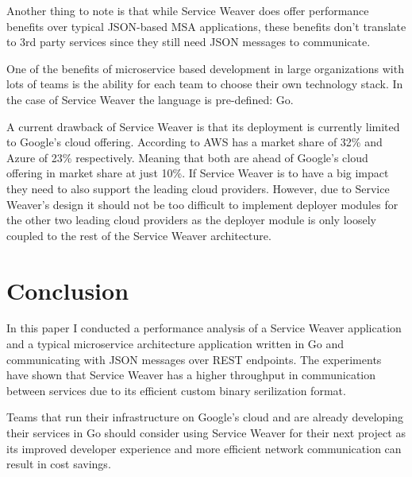 \documentclass[sigconf,review,9pt]{acmart}
\begin{document}
Another thing to note is that while Service Weaver does offer performance benefits
over typical JSON-based MSA applications, these benefits don't translate to 3rd party
services since they still need JSON messages to communicate.

One of the benefits of microservice based development in large organizations with
lots of teams is the ability for each team to choose their own technology stack.
In the case of Service Weaver the language is pre-defined: Go.

A current drawback of Service Weaver is that its deployment is currently limited to Google's
cloud offering.
According to \cite{InfographicBigThree2023} AWS \cite{AmazonWebServices} has a
market share of 32\% and Azure \cite{Azure} of 23\% respectively.
Meaning that both are ahead of Google's cloud offering \cite{GoogleCloud} in market
share at just 10\%.
If Service Weaver is to have a big impact they need to also support the leading
cloud providers.
However, due to Service Weaver's design it should not be too difficult to implement deployer
modules for the other two leading cloud providers as the deployer module is only
loosely coupled to the rest of the Service Weaver architecture. \cite{HowImplementService}

\section{Conclusion}
In this paper I conducted a performance analysis of a Service Weaver application
and a typical microservice architecture application written in Go and communicating
with JSON messages over REST endpoints.
The experiments have shown that Service Weaver has a higher throughput in communication
between services due to its efficient custom binary serilization format.

Teams that run their infrastructure on Google's cloud and are already developing
their services in Go should consider using Service Weaver for their next project
as its improved developer experience and more efficient network communication can
result in cost savings.



\end{document}
